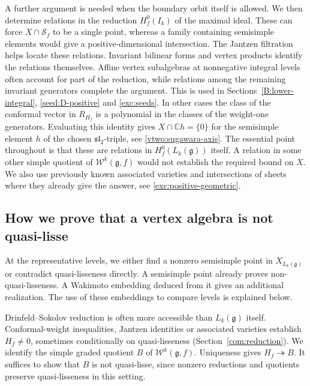 \documentclass[11pt,a4paper]{amsart}
\numberwithin{equation}{section}
\theoremstyle{definition}
\theoremstyle{remark}
\newcommand{\C}{\mathbb C}
\newcommand{\g}{\mathfrak g}
\newcommand{\slg}{\mathfrak{sl}}
\begin{document}
A further argument is needed when the boundary orbit itself is allowed.
We then determine relations in the reduction $H_f^0(I_k)$ of the
maximal ideal. These can force $X\cap\mathcal S_f$ to be a single
point, whereas a family containing semisimple elements would give a
positive-dimensional intersection. The Jantzen filtration helps locate these relations. Invariant bilinear
forms and vertex products identify the relations themselves. Affine vertex subalgebras
at nonnegative integral levels often account for part of the reduction,
while relations among the remaining invariant generators complete the argument. This is
used in Sections~\ref{B:lower-integral}, \ref{seed:D-positive} and
\ref{exc:seeds}. In other cases the class of the conformal vector
in $R_{H_f}$ is a polynomial in the classes of the weight-one
generators. Evaluating this identity gives $X\cap\C h=\{0\}$ for
the semisimple element $h$ of the chosen $\slg_2$-triple, see
\cref{vtwo:sugawara-axis}.
The essential point throughout is that these are relations in
$H_f^0(L_k(\g))$ itself. A relation in some other simple quotient of
$\mathcal W^k(\g,f)$ would not establish the required bound on $X$.
We also use previously known associated varieties and intersections
of sheets where they already give the answer, see
\cref{exc:positive-geometric}.

\subsection{How we prove that a vertex algebra is not quasi-lisse}
At the representative levels, we either find a nonzero semisimple
point in $X_{L_k(\g)}$ or contradict quasi-lisseness directly.
A semisimple point already proves non-quasi-lisseness. A Wakimoto
embedding deduced from it gives an additional realization. The use
of these embeddings to compare levels is explained below.

Drinfeld--Sokolov reduction is often more accessible than $L_k(\g)$
itself. Conformal-weight inequalities, Jantzen identities or associated varieties establish $H_f\ne0$, sometimes conditionally on quasi-lisseness (Section~\ref{com:reduction}). We identify the simple graded quotient $B$ of $\mathcal W^k(\g,f)$. Uniqueness gives $H_f\twoheadrightarrow B$.
It suffices to show that $B$ is not quasi-lisse, since nonzero reductions and quotients preserve quasi-lisseness in this setting.
\end{document}
